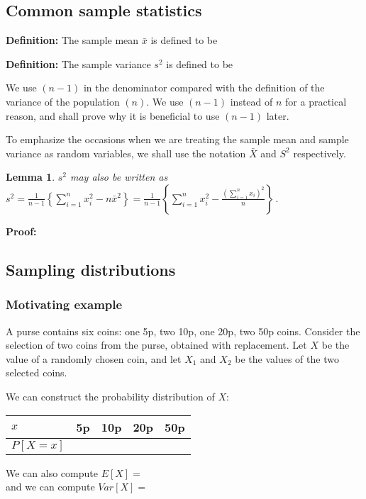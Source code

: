\documentclass[12pt]{article}
\theoremstyle{break}
\newtheorem{lemma}[theorem]{Lemma}
\begin{document}
\subsection{Common sample statistics}
\begin{mdframed}
{\bf Definition:} The sample mean $\bar{x}$ is defined to be
\textcolor[rgb]{1.00,1.00,1.00}{\lipsum[1]}
\end{mdframed}

\begin{mdframed}
{\bf Definition:} The sample variance $s^{2}$ is defined to be
\textcolor[rgb]{1.00,1.00,1.00}{\lipsum[1]}
\end{mdframed}
We use $(n-1)$  in the denominator compared with the definition of the variance of the population $(n)$.  We use $(n-1)$  instead of $n$ for a practical reason, and shall prove why it is beneficial to use $(n-1)$ later.

To emphasize the occasions when we are treating the sample mean and sample variance as random variables, we shall use the notation $\bar{X}$ and $S^{2}$ respectively.

\begin{lemma}
$s^2$ may also be written as $\displaystyle s^{2}=\frac{1}{n-1}\left\{\sum_{i=1}^{n}x_{i}^{2}-n\bar{x}^{2}\right\}=\frac{1}{n-1}\left\{\sum_{i=1}^{n}x_{i}^{2}-\frac{\left(\sum_{i=1}^{n}x_{i}\right)^{2}}{n}\right\}\, .$
\end{lemma}
\begin{mdframed}
{\bf Proof:}
\textcolor[rgb]{1.00,1.00,1.00}{\lipsum[1-3]}
\end{mdframed}

\subsection{Sampling distributions}
\subsubsection{Motivating example}
A purse contains six coins: one 5p, two 10p, one 20p, two 50p coins.  Consider the selection of two coins from the purse, obtained with replacement. Let $X$ be the value of a randomly chosen coin, and let $X_{1}$ and $X_{2}$ be the values of the two selected coins.

We can construct the probability distribution of $X$:
\begin{center}
\begin{tabular}{|l|c|c|c|c|}
  \hline
  $x$ & 5p & 10p & 20p & 50p \\ [8pt] \hline
  $P[X=x]$ & \hspace{1.5cm} & \hspace{1.5cm}  & \hspace{1.5cm}  & \hspace{1.5cm} \\ [8pt]
  \hline
\end{tabular}
\end{center}
We can also compute $E[X]=$\\[75pt]
and we can compute $Var[X]=$
\end{document}
